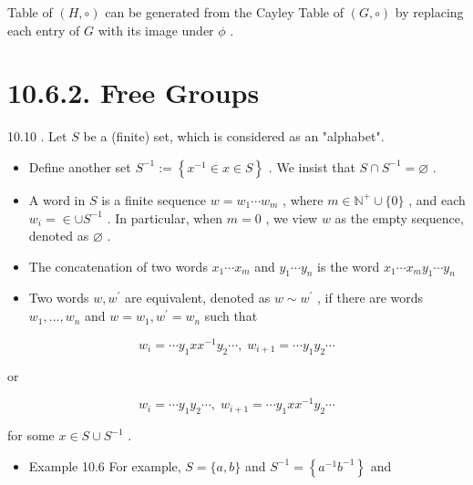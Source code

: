 Table of \(\left( {H, \circ  }\right)\) can be generated from the Cayley Table of \(\left( {G, \circ  }\right)\) by replacing each entry of \(G\) with its image under \(\phi\) .

\section*{10.6.2. Free Groups}

10.10 . Let \(S\) be a (finite) set, which is considered as an "alphabet".

\begin{itemize}
\item Define another set \({S}^{-1} \mathrel{\text{ := }} \left\{  {{x}^{-1} \in  x \in  S}\right\}\) . We insist that \(S \cap  {S}^{-1} = \varnothing\) .
\end{itemize}

\begin{itemize}
\item A word in \(S\) is a finite sequence \(w = {w}_{1}\cdots {w}_{m}\) , where \(m \in  {\mathbb{N}}^{ + } \cup  \{ 0\}\) , and each \({w}_{i} =  \in   \cup  {S}^{-1}\) . In particular, when \(m = 0\) , we view \(w\) as the empty sequence, denoted as \(\varnothing\) .
\end{itemize}

\begin{itemize}
\item The concatenation of two words \({x}_{1}\cdots {x}_{m}\) and \({y}_{1}\cdots {y}_{n}\) is the word \({x}_{1}\cdots {x}_{m}{y}_{1}\cdots {y}_{n}\)
\end{itemize}

\begin{itemize}
\item Two words \(w,{w}^{\prime }\) are equivalent, denoted as \(w \sim  {w}^{\prime }\) , if there are words \({w}_{1},\ldots ,{w}_{n}\) and \(w = {w}_{1},{w}^{\prime } = {w}_{n}\) such that
\end{itemize}

\[
{w}_{i} = \cdots {y}_{1}x{x}^{-1}{y}_{2}\cdots ,\;{w}_{i + 1} = \cdots {y}_{1}{y}_{2}\cdots
\]

or

\[
{w}_{i} = \cdots {y}_{1}{y}_{2}\cdots ,\;{w}_{i + 1} = \cdots {y}_{1}x{x}^{-1}{y}_{2}\cdots
\]

for some \(x \in  S \cup  {S}^{-1}\) .

\begin{itemize}
\item Example 10.6 For example, \(S = \{ a,b\}\) and \({S}^{-1} = \left\{  {{a}^{-1}{b}^{-1}}\right\}\) and
\end{itemize}

